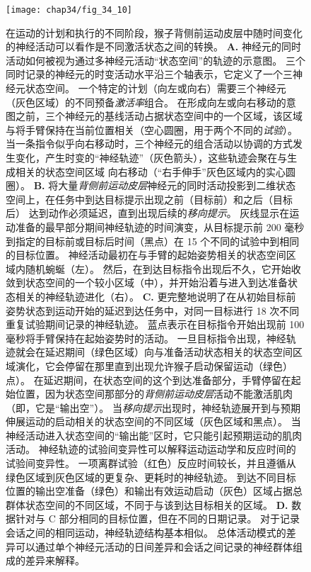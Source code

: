 \begin{figure}[htbp]
	\centering
	\texttt{[image: chap34/fig\_34\_10]}
	\caption{在运动的计划和执行的不同阶段，猴子背侧前运动皮层中随时间变化的神经活动可以看作是不同激活状态之间的转换。
		\textbf{A.} 神经元的同时活动如何被视为通过多神经元活动“状态空间”的轨迹的示意图。
		三个同时记录的神经元的时变活动水平沿三个轴表示，它定义了一个三神经元状态空间。
		一个特定的计划（向左或向右）需要三个神经元（灰色区域）的不同预备\textit{激活率}组合。
		在形成向左或向右移动的意图之前，三个神经元的基线活动占据状态空间中的一个区域，该区域与将手臂保持在当前位置相关（空心圆圈，用于两个不同的\textit{试验}）。
		当一条指令似乎向右移动时，三个神经元的组合活动以协调的方式发生变化，产生时变的“神经轨迹”（灰色箭头），这些轨迹会聚在与生成相关的状态空间区域 向右移动（“右手伸手”灰色区域内的实心圆圈）。
		\textbf{B.} 将大量\textit{背侧前运动皮层}神经元的同时活动投影到二维状态空间上，在任务中到达目标提示出现之前（目标前）和之后（目标后） 达到动作必须延迟，直到出现后续的\textit{移向提示}。
		灰线显示在运动准备的最早部分期间神经轨迹的时间演变，从目标提示前 200 毫秒到指定的目标前或目标后时间（黑点）在 15 个不同的试验中到相同的目标位置。
		神经活动最初在与手臂的起始姿势相关的状态空间区域内随机蜿蜒（左）。
		然后，在到达目标指令出现后不久，它开始收敛到状态空间的一个较小区域（中），并开始沿着与进入到达准备状态相关的神经轨迹进化（右）。
		\textbf{C.} 更完整地说明了在从初始目标前姿势状态到运动开始的延迟到达任务中，对同一目标进行 18 次不同重复试验期间记录的神经轨迹。
		蓝点表示在目标指令开始出现前 100 毫秒将手臂保持在起始姿势时的活动。
		一旦目标指令出现，神经轨迹就会在延迟期间（绿色区域）向与准备活动状态相关的状态空间区域演化，它会停留在那里直到出现允许猴子启动保留运动（绿色） 点）。
		在延迟期间，在状态空间的这个到达准备部分，手臂停留在起始位置，因为状态空间那部分的\textit{背侧前运动皮层}活动不能激活肌肉（即，它是“输出空”）。
		当\textit{移向提示}出现时，神经轨迹展开到与预期伸展运动的启动相关的状态空间的不同区域（灰色区域和黑点）。
		当神经活动进入状态空间的“输出能”区时，它只能引起预期运动的肌肉活动。
		神经轨迹的试验间变异性可以解释运动运动学和反应时间的试验间变异性。
		一项离群试验（红色）反应时间较长，并且遵循从绿色区域到灰色区域的更复杂、更耗时的神经轨迹。
		到达不同目标位置的输出空准备（绿色）和输出有效运动启动（灰色）区域占据总群体状态空间的不同区域，不同于与该到达目标相关的区域。
		\textbf{D.} 数据针对与 C 部分相同的目标位置，但在不同的日期记录。
		对于记录会话之间的相同运动，神经轨迹结构基本相似。
		总体活动模式的差异可以通过单个神经元活动的日间差异和会话之间记录的神经群体组成的差异来解释。}
	\label{fig:34_10}
\end{figure}



